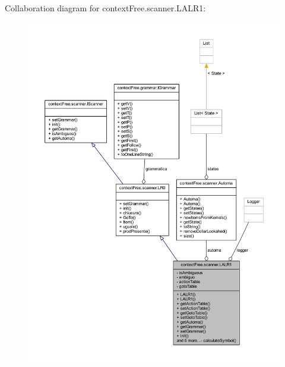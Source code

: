 Collaboration diagram for context\-Free.\-scanner.\-L\-A\-L\-R1\-:\nopagebreak
\begin{figure}[H]
\begin{center}
\leavevmode
\includegraphics[width=350pt]{classcontext_free_1_1scanner_1_1_l_a_l_r1__coll__graph}
\end{center}
\end{figure}
